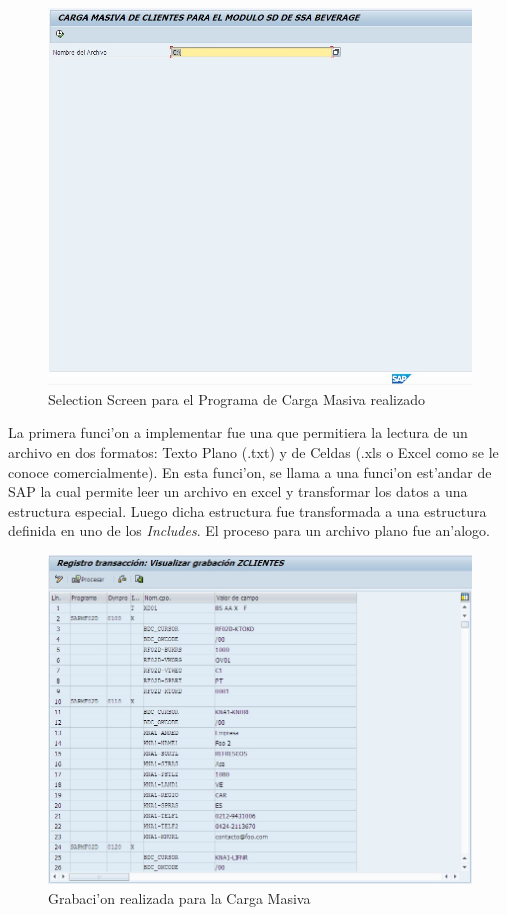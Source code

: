 \newline
\newline
\begin{figure}[H]
\centering
\includegraphics[scale=0.65,type=jpg,ext=.jpg,read=.jpg]{figures/screen}
\caption{Selection Screen para el Programa de Carga Masiva realizado}
\label{fig:screen}
\end{figure}
\indent La primera funci'on a implementar fue una que permitiera la lectura de un archivo en dos formatos: Texto Plano (.txt) y de Celdas (.xls o Excel como se le conoce comercialmente). En esta funci'on, se llama a una funci'on est'andar de SAP la cual permite leer un archivo en excel y transformar los datos a una estructura especial. Luego dicha estructura fue transformada a una estructura definida en uno de los \textit{Includes}. El proceso para un archivo plano fue an'alogo.
\newline
\newline
\begin{figure}[H]
\centering
\includegraphics[scale=0.65,type=jpg,ext=.jpg,read=.jpg]{figures/sm35}
\caption{Grabaci'on realizada para la Carga Masiva}
\label{fig:sm35}
\end{figure}
